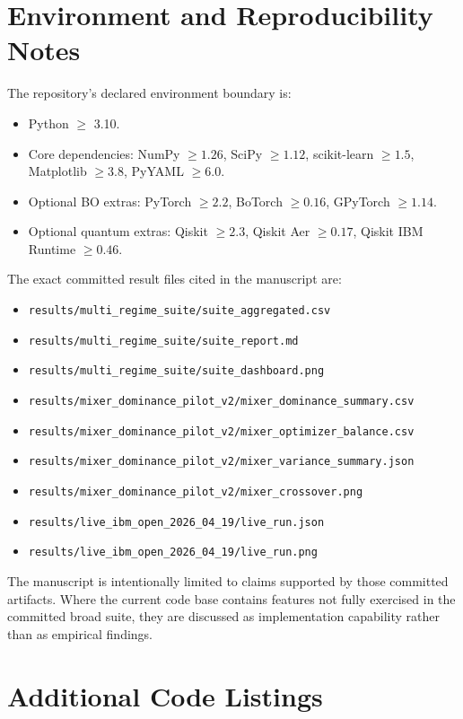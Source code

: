 \documentclass[11pt]{article}
\begin{document}
\section{Environment and Reproducibility Notes}\label{app:environment}

The repository's declared environment boundary is:
\begin{itemize}[leftmargin=1.5em]
\item Python \(\geq\) 3.10.
\item Core dependencies: NumPy \(\geq 1.26\), SciPy \(\geq 1.12\), scikit-learn \(\geq 1.5\), Matplotlib \(\geq 3.8\), PyYAML \(\geq 6.0\).
\item Optional BO extras: PyTorch \(\geq 2.2\), BoTorch \(\geq 0.16\), GPyTorch \(\geq 1.14\).
\item Optional quantum extras: Qiskit \(\geq 2.3\), Qiskit Aer \(\geq 0.17\), Qiskit IBM Runtime \(\geq 0.46\).
\end{itemize}

The exact committed result files cited in the manuscript are:
\begin{itemize}[leftmargin=1.5em]
\item \texttt{results/multi\_regime\_suite/suite\_aggregated.csv}
\item \texttt{results/multi\_regime\_suite/suite\_report.md}
\item \texttt{results/multi\_regime\_suite/suite\_dashboard.png}
\item \texttt{results/mixer\_dominance\_pilot\_v2/mixer\_dominance\_summary.csv}
\item \texttt{results/mixer\_dominance\_pilot\_v2/mixer\_optimizer\_balance.csv}
\item \texttt{results/mixer\_dominance\_pilot\_v2/mixer\_variance\_summary.json}
\item \texttt{results/mixer\_dominance\_pilot\_v2/mixer\_crossover.png}
\item \texttt{results/live\_ibm\_open\_2026\_04\_19/live\_run.json}
\item \texttt{results/live\_ibm\_open\_2026\_04\_19/live\_run.png}
\end{itemize}

The manuscript is intentionally limited to claims supported by those committed artifacts. Where the current code base contains features not fully exercised in the committed broad suite, they are discussed as implementation capability rather than as empirical findings.

\section{Additional Code Listings}\label{app:listings}
\end{document}
